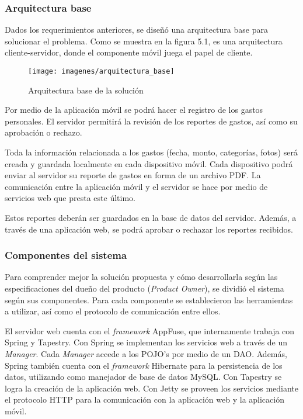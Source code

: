 \subsubsection{Arquitectura base}

Dados los requerimientos anteriores, se diseñó una arquitectura base para solucionar el problema. Como se muestra en la figura 5.1, es una arquitectura cliente-servidor, donde el componente móvil juega el papel de cliente.

\begin{figure}[ht]
  \centering
  \texttt{[image: imagenes/arquitectura\_base]}
  \caption{Arquitectura base de la solución}
  \label{fig:arquitecturaBase}
\end{figure}

Por medio de la aplicación móvil se podrá hacer el registro de los gastos personales. El servidor permitirá la revisión de los reportes de gastos, así como su aprobación o rechazo.

Toda la información relacionada a los gastos (fecha, monto, categorías, fotos) será creada y guardada localmente en cada dispositivo móvil. Cada dispositivo podrá enviar al servidor su reporte de gastos en forma de un archivo PDF. La comunicación entre la aplicación móvil y el servidor se hace por medio de servicios web que presta este último.

Estos reportes deberán ser guardados en la base de datos del servidor. Además, a través de una aplicación web, se podrá aprobar o rechazar los reportes recibidos.

\subsubsection{Componentes del sistema}

Para comprender mejor la solución propuesta y cómo desarrollarla según las especificaciones del dueño del producto (\textit{Product Owner}), se dividió el sistema según sus componentes. Para cada componente se establecieron las herramientas a utilizar, así como el protocolo de comunicación entre ellos.

El servidor web cuenta con el \textit{framework} AppFuse, que internamente trabaja con Spring y Tapestry. Con Spring se implementan los servicios web a través de un \textit{Manager}. Cada \textit{Manager} accede a los POJO's por medio de un DAO. Además, Spring también cuenta con el \textit{framework} Hibernate para la persistencia de los datos, utilizando como manejador de base de datos MySQL. Con Tapestry se logra la creación de la aplicación web. Con Jetty se proveen los servicios mediante el protocolo HTTP para la comunicación con la aplicación web y la aplicación móvil.

